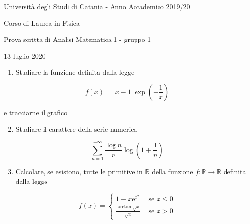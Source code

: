 \documentclass[10pt]{article}
\begin{document}
Università degli Studi di Catania - Anno Accademico 2019/20

Corso di Laurea in Fisica

Prova scritta di Analisi Matematica 1 - gruppo 1

13 luglio 2020

\begin{enumerate}
  \item Studiare la funzione definita dalla legge
\end{enumerate}

\[
f(x)=|x-1| \exp \left(-\frac{1}{x}\right)
\]

e tracciarne il grafico.

\begin{enumerate}
  \setcounter{enumi}{1}
  \item Studiare il carattere della serie numerica
\end{enumerate}

\[
\sum_{n=1}^{+\infty} \frac{\log n}{n} \log \left(1+\frac{1}{n}\right)
\]

\begin{enumerate}
  \setcounter{enumi}{2}
  \item Calcolare, se esistono, tutte le primitive in \(\mathbb{R}\) della funzione \(f: \mathbb{R} \rightarrow \mathbb{R}\) definita dalla legge
\end{enumerate}

\[
f(x)= \begin{cases}1-x \mathrm{e}^{x^{2}} & \text { se } x \leq 0 \\ \frac{\arctan \sqrt{x}}{\sqrt{x}} & \text { se } x>0\end{cases}
\]
\end{document}
